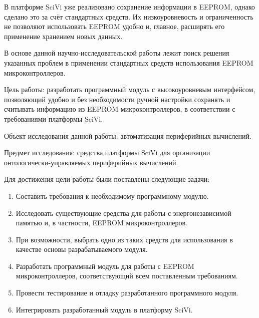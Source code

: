 В платформе SciVi уже реализовано сохранение информации в EEPROM, однако сделано это за счёт стандартных средств.
Их низкоуровневость и ограниченность не позволяют использовать EEPROM удобно и, главное, расширять его применение хранением новых данных.

В основе данной научно-исследовательской работы лежит поиск решения указанных проблем в применении стандартных средств использования EEPROM микроконтроллеров.

Цель работы: разработать программный модуль с высокоуровневым интерфейсом, позволяющий удобно и без необходимости ручной настройки сохранять и считывать информацию из EEPROM микроконтроллеров, в соответствии с требованиями платформы SciVi.

Объект исследования данной работы: автоматизация периферийных вычислений.

Предмет исследования: средства платформы SciVi для организации онтологически-управляемых периферийных вычислений.

Для достижения цели работы были поставлены следующие задачи:
\begin{enumerate}
	\item Составить требования к необходимому программному модулю.
	\item Исследовать существующие средства для работы с энергонезависимой памятью и, в частности, EEPROM микроконтроллеров.
	\item При возможности, выбрать одно из таких средств для использования в качестве основы разрабатываемого модуля.
	\item Разработать программный модуль для работы с EEPROM микроконтроллеров, соответствующий всем поставленным требованиям.
	\item Провести тестирование и отладку разработанного программного модуля.
	\item Интегрировать разработанный модуль в платформу SciVi.
\end{enumerate}

